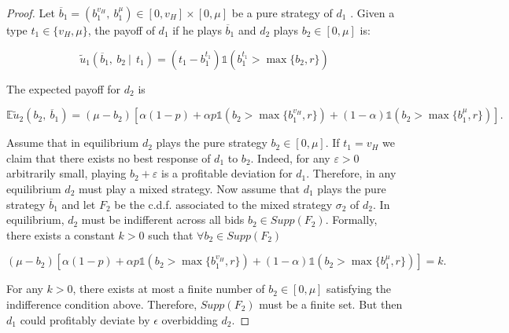 \documentclass[11pt]{article}
\theoremstyle{plain}
\theoremstyle{definition}
\theoremstyle{plain}
\theoremstyle{plain}
\theoremstyle{plain}
\theoremstyle{plain}
\numberwithin{equation}{section}
\begin{document}
\begin{proof}
\noindent Let $ \overline{b}_1 = \left(b_1^{v_H},\ b_1^{\mu}\right) \in [0, v_H] \times [0, \mu] $ be a pure strategy of $ d_1 $ . Given a type $ t_1 \in \{ v_H, \mu \} $, the payoff of $ d_1 $ if he plays $ \overline{b}_1 $ and $ d_2 $ plays $ b_2 \in [0, \mu] $ is:

\begin{equation*}
\tilde{u}_1(\overline{b}_1,\ b_2 \ | \ \ t_1) = \left( t_1 - b_1^{t_1} \right) \mathbb{1}\left( b_1^{t_1} > \max\{b_2, r\} \right)
\end{equation*}

\vspace{0.4cm}

\noindent The expected payoff for $ d_2 $ is


\begin{equation*}
 \mathbb{E}\tilde{u}_2 \left(b_2,\ \overline{b}_1 \right) = (\mu - b_2) \left[ \alpha (1 - p) + \alpha p \mathbb{1}\left(b_2 > \max\{b_1^{v_H}, r\}\right) + (1 - \alpha) \mathbb{1}\left(b_2 > \max\{b_1^{\mu}, r\}\right) \right].
\end{equation*}

\vspace{0.4cm}

\noindent Assume that in equilibrium $ d_2 $ plays the pure strategy $ b_2 \in [0, \mu] $. If $ t_1 = v_H $ we claim that there exists no best response of $ d_1 $ to $ b_2 $. Indeed, for any $ \varepsilon > 0 $ arbitrarily small, playing $ b_2 + \varepsilon $ is a profitable deviation for $ d_1 $. Therefore, in any equilibrium $ d_2 $ must play a mixed strategy. Now assume that $ d_1 $ plays the pure strategy $ \overline{b}_1 $ and let $ F_2 $ be the c.d.f. associated to the mixed strategy $ \sigma_2 $ of $ d_2 $. In equilibrium, $ d_2 $ must be indifferent across all bids $ b_2 \in Supp(F_2) $. Formally, there exists a constant $ k > 0 $ such that $ \forall b_2 \in Supp(F_2) $

\begin{equation*}
 (\mu - b_2) \left[ \alpha (1 - p) + \alpha p \mathbb{1}\left( b_2 > \max\{b_1^{v_H}, r\}\right) + (1 - \alpha) \mathbb{1}\left(b_2 > \max\{b_1^{\mu}, r\} \right) \right] = k.
\end{equation*}

\vspace{0.2cm}

\noindent For any $ k > 0 $, there exists at most a finite number of $ b_2 \in [0, \mu] $ satisfying the indifference condition above. Therefore, $ Supp(F_2) $ must be a finite set. But then $ d_1 $ could profitably deviate by $ \epsilon $ overbidding $ d_2 $.

\end{proof}
\end{document}
